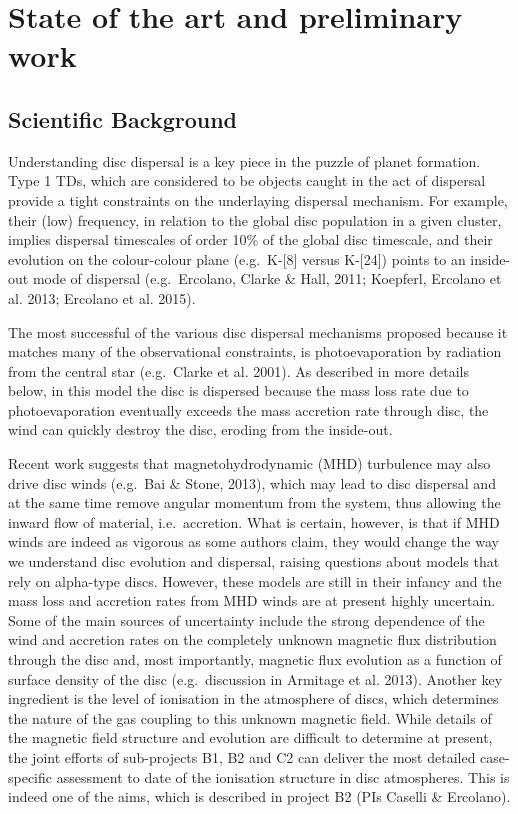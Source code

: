 \documentclass[10pt,fleqn,twoside]{article}
\begin{document}
\section{State of the art and preliminary work}
\renewcommand{\leftmark}{\sc State of the Art and preliminary work}

\subsection{Scientific Background}

Understanding disc dispersal is a key piece in the puzzle of planet
formation. Type 1 TDs, which are considered to be objects caught in
the act of dispersal provide a tight constraints on the underlaying
dispersal mechanism. For example, their (low) frequency, in relation
to the global disc population in a given cluster, implies dispersal
timescales of order 10\% of the global disc timescale, and their
evolution on the colour-colour plane (e.g.\ K-[8] versus K-[24]) points
to an inside-out mode of 
dispersal (e.g.\ Ercolano, Clarke \& Hall, 2011; Koepferl, Ercolano et
al. 2013; Ercolano et al. 2015). 

The most successful of the various disc dispersal mechanisms proposed
because it
matches many of the observational constraints, 
is photoevaporation by radiation from the central star
(e.g.\ Clarke et al. 2001). As described in more details below, in this
model the disc is dispersed because
the mass loss rate due to photoevaporation eventually exceeds the mass accretion
rate through disc, the wind can quickly destroy the disc, eroding from the inside-out.

Recent work suggests that magnetohydrodynamic (MHD) turbulence may also
drive disc winds (e.g.\ Bai \& Stone, 2013), which may lead to disc
dispersal and at the same time remove angular momentum from the
system, thus allowing the inward flow of material, i.e.\ accretion. What is certain, however, is that if MHD winds are indeed
as vigorous as some authors claim, they would change the
way we understand disc evolution and dispersal, raising questions
about models that  rely on alpha-type discs. However, these models are still in their infancy and the
mass loss and accretion rates from MHD winds are at present highly
uncertain. Some of the main
sources of uncertainty include the strong dependence of the wind and
accretion rates on the completely unknown magnetic flux distribution
through the disc and, most importantly, magnetic flux evolution as a
function of surface density of the disc (e.g.\ discussion in Armitage
et al. 2013). Another key ingredient is the level of ionisation in the
atmosphere of discs, which determines the nature of the gas coupling to
this unknown magnetic field. While details of the magnetic field
structure and evolution are difficult to determine at present, the
joint efforts of sub-projects B1, B2 and C2 can deliver the most
detailed case-specific assessment to date of the ionisation structure in disc
atmospheres. This is indeed one of the aims, which is described in
project B2 (PIs Caselli \& Ercolano).  
\end{document}
